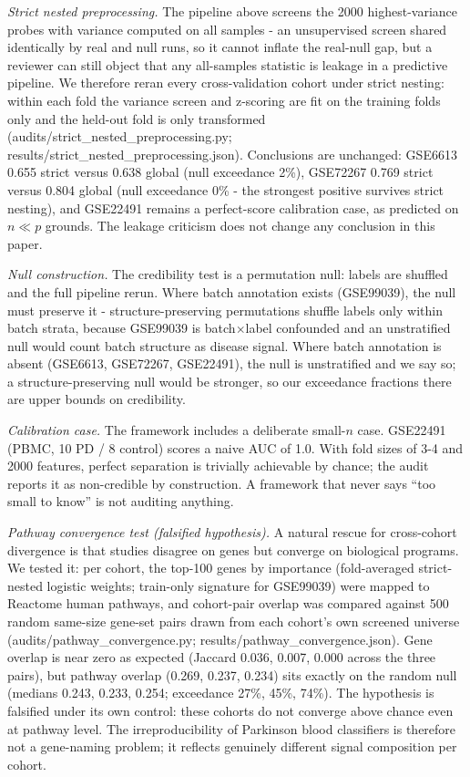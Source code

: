 \emph{Strict nested preprocessing.} The pipeline above screens the
2000 highest-variance probes with variance computed on all samples - an
unsupervised screen shared identically by real and null runs, so it cannot
inflate the real-null gap, but a reviewer can still object that any
all-samples statistic is leakage in a predictive pipeline. We therefore reran
every cross-validation cohort under strict nesting: within each fold the
variance screen and z-scoring are fit on the training folds only and the
held-out fold is only transformed (audits/strict\_nested\_preprocessing.py;
results/strict\_nested\_preprocessing.json). Conclusions are unchanged:
GSE6613 0.655 strict versus 0.638 global (null exceedance 2\%), GSE72267
0.769 strict versus 0.804 global (null exceedance 0\% - the strongest
positive survives strict nesting), and GSE22491 remains a perfect-score
calibration case, as predicted on $n \ll p$ grounds. The leakage criticism
does not change any conclusion in this paper.

\emph{Null construction.} The credibility test is a permutation null: labels
are shuffled and the full pipeline rerun. Where batch annotation exists
(GSE99039), the null must preserve it - structure-preserving permutations
shuffle labels only within batch strata, because GSE99039 is batch$\times$label
confounded and an unstratified null would count batch structure as disease
signal. Where batch annotation is absent (GSE6613, GSE72267, GSE22491), the
null is unstratified and we say so; a structure-preserving null would be
stronger, so our exceedance fractions there are upper bounds on credibility.

\emph{Calibration case.} The framework includes a deliberate small-$n$ case.
GSE22491 (PBMC, 10 PD / 8 control) scores a naive AUC of 1.0. With fold sizes
of 3-4 and 2000 features, perfect separation is trivially achievable by
chance; the audit reports it as non-credible by construction. A framework that
never says ``too small to know'' is not auditing anything.

\emph{Pathway convergence test (falsified hypothesis).} A natural rescue
for cross-cohort divergence is that studies disagree on genes but converge on
biological programs. We tested it: per cohort, the top-100 genes by importance
(fold-averaged strict-nested logistic weights; train-only signature for
GSE99039) were mapped to Reactome human pathways, and cohort-pair overlap was
compared against 500 random same-size gene-set pairs drawn from each cohort's
own screened universe (audits/pathway\_convergence.py;
results/pathway\_convergence.json). Gene overlap is near zero as expected
(Jaccard 0.036, 0.007, 0.000 across the three pairs), but pathway overlap
(0.269, 0.237, 0.234) sits exactly on the random null (medians 0.243, 0.233,
0.254; exceedance 27\%, 45\%, 74\%). The hypothesis is falsified under its
own control: these cohorts do not converge above chance even at pathway level.
The irreproducibility of Parkinson blood classifiers is therefore not a
gene-naming problem; it reflects genuinely different signal composition per
cohort.

